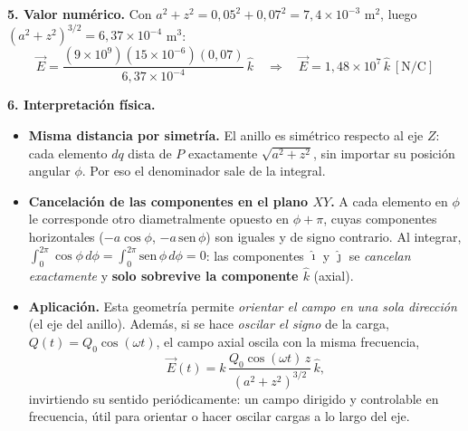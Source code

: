 \documentclass[12pt,letterpaper]{article}
\newcommand{\secgap}{\vspace{0.6cm}}
\begin{document}
\secgap

\noindent\textbf{5. Valor num\'erico.} Con $a^2+z^2 = 0{,}05^2+0{,}07^2 = 7{,}4\times10^{-3}$ m$^2$, luego
$(a^2+z^2)^{3/2}=6{,}37\times10^{-4}$ m$^3$:
\[
    \vec E = \frac{(9\times10^{9})(15\times10^{-6})(0{,}07)}{6{,}37\times10^{-4}}\,\hat k
    \quad\Longrightarrow\quad
    \boxed{\vec E = 1{,}48\times10^{7}\,\hat k\ [\text{N/C}]}
\]

\secgap

\noindent\textbf{6. Interpretaci\'on f\'isica.}
\begin{itemize}\itemsep8pt
    \item \textbf{Misma distancia por simetr\'ia.} El anillo es sim\'etrico respecto al eje $Z$: cada
    elemento $dq$ dista de $P$ exactamente $\sqrt{a^2+z^2}$, sin importar su posici\'on angular $\phi$.
    Por eso el denominador sale de la integral.
    \item \textbf{Cancelaci\'on de las componentes en el plano $XY$.} A cada elemento en $\phi$ le
    corresponde otro diametralmente opuesto en $\phi+\pi$, cuyas componentes horizontales
    ($-a\cos\phi$, $-a\,\mathrm{sen}\,\phi$) son iguales y de signo contrario. Al integrar,
    $\int_0^{2\pi}\cos\phi\,d\phi=\int_0^{2\pi}\mathrm{sen}\,\phi\,d\phi=0$: las componentes $\hat\imath$ y
    $\hat\jmath$ se \emph{cancelan exactamente} y \textbf{solo sobrevive la componente $\hat k$} (axial).
    \item \textbf{Aplicaci\'on.} Esta geometr\'ia permite \emph{orientar el campo en una sola direcci\'on}
    (el eje del anillo). Adem\'as, si se hace \emph{oscilar el signo} de la carga,
    $Q(t)=Q_0\cos(\omega t)$, el campo axial oscila con la misma frecuencia,
    \[
        \vec E(t) = k\,\frac{Q_0\cos(\omega t)\,z}{(a^2+z^2)^{3/2}}\,\hat k,
    \]
    invirtiendo su sentido peri\'odicamente: un campo dirigido y controlable en frecuencia, \'util para
    orientar o hacer oscilar cargas a lo largo del eje.
\end{itemize}
\end{document}
